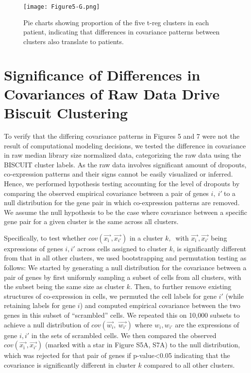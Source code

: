 \begin{figure}
\centering
\texttt{[image: Figure5-G.png]}
\caption{Pie charts showing proportion of the five t-reg clusters in each patient, indicating that differences in covariance patterns between clusters also translate to patients.
}
\label{fig:5g}
\end{figure}

\section{Significance of Differences in Covariances of Raw Data Drive Biscuit Clustering}

To verify that the differing covariance patterns in Figures 5 and 7 were not the result of computational modeling decisions, we tested the difference in covariance in raw median library size normalized data, categorizing the raw data using the BISCUIT cluster labels.  
As the raw data involves significant amount of dropouts, co-expression patterns and their signs cannot be easily visualized or inferred.
Hence, we performed hypothesis testing accounting for the level of dropouts by comparing the observed empirical covariance between a pair of genes \(i,\ i'\ \)to a null distribution for the gene pair in which co-expression patterns are removed.
We assume the null hypothesis to be the case where covariance between a specific gene pair for a given cluster is the same across all clusters.

Specifically, to test whether \(cov(\overrightarrow{x_{\text{i\ }}},\overrightarrow{x_{i'}})\) in a cluster \(k,\ \) with \(\overrightarrow{x_{\text{i\ }}},\overrightarrow{x_{i'}}\) being expressions of genes \(i,i'\) across cells assigned to cluster \(k\), is significantly different from that in all other clusters, we used bootstrapping and permutation testing as follows: We started by generating a null distribution for the covariance between a pair of genes by first uniformly sampling a subset of cells from all clusters, with the subset being the same size as cluster \(k\).
Then, to further remove existing structures of co-expression in cells, we permuted the cell labels for gene \(i'\) (while retaining labels for gene \(i\)) and computed empirical covariance between the two genes in this subset of ``scrambled'' cells.
We repeated this on 10,000 subsets to achieve a null distribution of \(cov(\overrightarrow{w_{i}},\ \overrightarrow{w_{i'}})\) where \(w_{i},w_{i'}\) are the expressions of gene \(i,i'\) in the sets of scrambled cells.
We then compared the observed \(cov(\overrightarrow{x_{\text{i\ }}},\overrightarrow{x_{i'}})\) (marked with a star in Figure S5A, S7A) to the null distribution, which was rejected for that pair of genes if p-value\textless{}0.05 indicating that the covariance is significantly different in cluster \(k\) compared to all other clusters.

